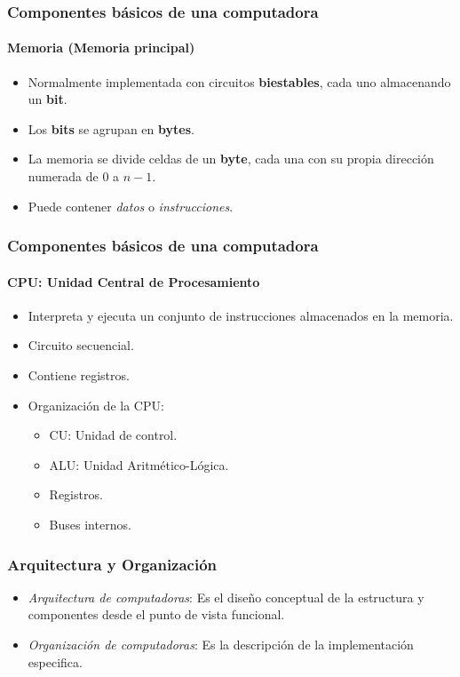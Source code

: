 \documentclass[11pt,a4paper,spanish]{beamer}
\begin{document}
\begin{frame}
    \frametitle{Componentes básicos de una computadora}
    \framesubtitle{Memoria (Memoria principal)}
    \pause
    \begin{itemize}
        \item Normalmente implementada con circuitos \textbf{biestables}, cada
            uno almacenando un \textbf{bit}. \pause
        \item Los \textbf{bits} se agrupan en \textbf{bytes}.
            \pause
        \item La memoria se divide celdas de un \textbf{byte}, cada una con su
            propia dirección numerada de $0$ a $n-1$. \pause
        \item Puede contener \emph{datos} o \emph{instrucciones}.
    \end{itemize}
\end{frame}

\begin{frame}
    \frametitle{Componentes básicos de una computadora}
    \framesubtitle{CPU: Unidad Central de Procesamiento}
    \pause
    \begin{itemize}
        \item Interpreta y ejecuta un conjunto de instrucciones almacenados en
            la memoria. \pause
        \item Circuito secuencial. \pause
        \item Contiene registros. \pause
        \item Organización de la CPU: \pause
        \begin{itemize}
            \item CU: Unidad de control. \pause
            \item ALU: Unidad Aritmético-Lógica. \pause
            \item Registros. \pause
            \item Buses internos.
        \end{itemize}
    \end{itemize}
\end{frame}

\begin{frame}
    \frametitle{Arquitectura y Organización}
    \begin{itemize}
        \item \emph{Arquitectura de computadoras}: Es el diseño conceptual de
            la estructura y componentes desde el punto de vista funcional.
        \item \emph{Organización de computadoras}: Es la descripción de la
            implementación especifica.
    \end{itemize}
\end{frame}
\end{document}
